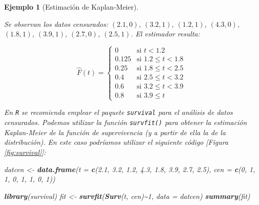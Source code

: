 \documentclass[
]{book}
\newenvironment{Shaded}{\begin{snugshade}}{\end{snugshade}}
\newcommand{\AttributeTok}[1]{\textcolor[rgb]{0.13,0.29,0.53}{#1}}
\newcommand{\DecValTok}[1]{\textcolor[rgb]{0.00,0.00,0.81}{#1}}
\newcommand{\FloatTok}[1]{\textcolor[rgb]{0.00,0.00,0.81}{#1}}
\newcommand{\FunctionTok}[1]{\textcolor[rgb]{0.13,0.29,0.53}{\textbf{#1}}}
\newcommand{\NormalTok}[1]{#1}
\newcommand{\OtherTok}[1]{\textcolor[rgb]{0.56,0.35,0.01}{#1}}
\newcommand{\SpecialCharTok}[1]{\textcolor[rgb]{0.81,0.36,0.00}{\textbf{#1}}}
\theoremstyle{break}
\newtheorem{example}{Ejemplo}[chapter]
\theoremstyle{nonumberplain}
\begin{document}
\begin{example}[Estimación de Kaplan-Meier]
\protect\hypertarget{exm:kaplan-meier}{}\label{exm:kaplan-meier}

\vspace{0.5cm}

Se observan los datos censurados: \(\left( 2.1,0 \right)\),
\(\left(3.2,1 \right)\), \(\left( 1.2,1 \right)\), \(\left( 4.3,0 \right)\), \(\left(
1.8,1 \right)\), \(\left( 3.9,1 \right)\), \(\left( 2.7,0 \right)\), \(\left(
2.5,1 \right)\). El estimador resulta:

\[\hat{F}\left( t \right) =\left\{ 
\begin{array}{ll}
0& \text{si } t<1.2 \\ 
0.125& \text{si } 1.2\leq t<1.8 \\ 
0.25& \text{si } 1.8\leq t<2.5 \\ 
0.4& \text{si } 2.5\leq t<3.2 \\ 
0.6& \text{si } 3.2\leq t<3.9 \\ 
0.8& \text{si } 3.9\leq t
\end{array}
\right.\]

En \texttt{R} se recomienda emplear el paquete \texttt{survival} para el análisis de
datos censurados. Podemos utilizar la función \texttt{survfit()} para obtener
la estimación Kaplan-Meier de la función de supervivencia
(y a partir de ella la de la distribución).
En este caso podríamos utilizar el siguiente código {[}Figura \ref{fig:survival}{]}:

\begin{Shaded}
\begin{Highlighting}[]
\NormalTok{datcen }\OtherTok{\textless{}{-}} \FunctionTok{data.frame}\NormalTok{(}\AttributeTok{t =} \FunctionTok{c}\NormalTok{(}\FloatTok{2.1}\NormalTok{, }\FloatTok{3.2}\NormalTok{, }\FloatTok{1.2}\NormalTok{, }\FloatTok{4.3}\NormalTok{, }\FloatTok{1.8}\NormalTok{, }\FloatTok{3.9}\NormalTok{, }\FloatTok{2.7}\NormalTok{, }\FloatTok{2.5}\NormalTok{), }
                 \AttributeTok{cen =} \FunctionTok{c}\NormalTok{(}\DecValTok{0}\NormalTok{, }\DecValTok{1}\NormalTok{, }\DecValTok{1}\NormalTok{, }\DecValTok{0}\NormalTok{, }\DecValTok{1}\NormalTok{, }\DecValTok{1}\NormalTok{, }\DecValTok{0}\NormalTok{, }\DecValTok{1}\NormalTok{))}

\FunctionTok{library}\NormalTok{(survival)}
\NormalTok{fit }\OtherTok{\textless{}{-}} \FunctionTok{survfit}\NormalTok{(}\FunctionTok{Surv}\NormalTok{(t, cen)}\SpecialCharTok{\textasciitilde{}}\DecValTok{1}\NormalTok{, }\AttributeTok{data =}\NormalTok{ datcen)}
\FunctionTok{summary}\NormalTok{(fit)}
\end{Highlighting}
\end{Shaded}


\end{example}
\end{document}
